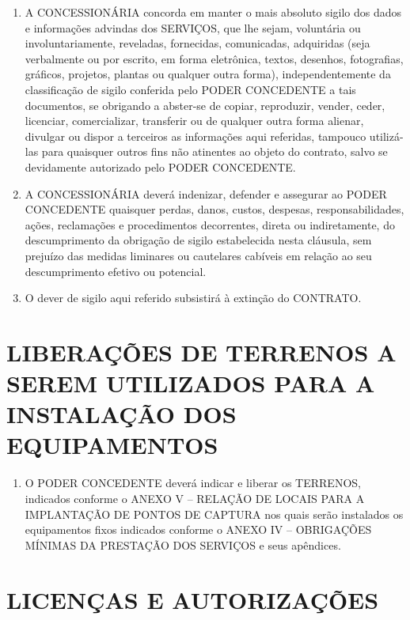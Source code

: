\documentclass[a4paper,11pt]{report} %
\begin{document}
\begin{enumerate}
\item \label{itm:WB67} A CONCESSIONÁRIA concorda em manter o mais absoluto sigilo dos dados e informações advindas dos SERVIÇOS, que lhe sejam, voluntária ou involuntariamente, reveladas, fornecidas, comunicadas, adquiridas (seja verbalmente ou por escrito, em forma eletrônica, textos, desenhos, fotografias, gráficos, projetos, plantas ou qualquer outra forma), independentemente da classificação de sigilo conferida pelo PODER CONCEDENTE a tais documentos, se obrigando a abster-se de copiar, reproduzir, vender, ceder, licenciar, comercializar, transferir ou de qualquer outra forma alienar, divulgar ou dispor a terceiros as informações aqui referidas, tampouco utilizá-las para quaisquer outros fins não atinentes ao objeto do contrato, salvo se devidamente autorizado pelo PODER CONCEDENTE.  
\item \label{itm:SJRF} A CONCESSIONÁRIA deverá indenizar, defender e assegurar ao PODER CONCEDENTE quaisquer perdas, danos, custos, despesas, responsabilidades, ações, reclamações e procedimentos decorrentes, direta ou indiretamente, do descumprimento da obrigação de sigilo estabelecida nesta cláusula, sem prejuízo das medidas liminares ou cautelares cabíveis em relação ao seu descumprimento efetivo ou potencial.
\item \label{itm:4JAW}  O dever de sigilo aqui referido subsistirá à extinção do CONTRATO.
\end{enumerate}

\section{LIBERAÇÕES DE TERRENOS A SEREM UTILIZADOS PARA A INSTALAÇÃO DOS EQUIPAMENTOS}
\label{sec:TXD9}

\begin{enumerate}
\item \label{itm:T8P0}	O PODER CONCEDENTE deverá indicar e liberar os TERRENOS, indicados conforme o ANEXO V – RELAÇÃO DE LOCAIS PARA A IMPLANTAÇÃO DE PONTOS DE CAPTURA nos quais serão instalados os equipamentos fixos indicados conforme o ANEXO IV – OBRIGAÇÕES MÍNIMAS DA PRESTAÇÃO DOS SERVIÇOS e seus apêndices.
\end{enumerate}

\section{LICENÇAS E AUTORIZAÇÕES}
\label{sec:F39J}
\end{document}
